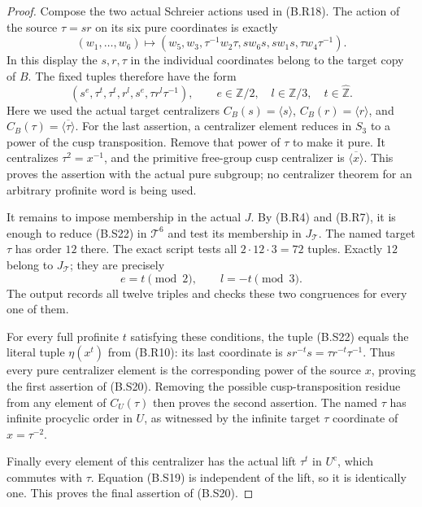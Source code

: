 \begin{proof}
Compose the two actual Schreier actions used in
(B.R18).  The action of the source $\tau=sr$ on its
six pure coordinates is exactly
\[
 (w_1,\ldots,w_6)\longmapsto
 (w_5,w_3,\tau^{-1}w_2\tau,
                    sw_6s,sw_1s,\tau w_4\tau^{-1}).            \tag{B.S21}
\]
In this display the $s,r,\tau$ in the individual
coordinates belong to the target copy of $B$.
The fixed tuples therefore have the form
\[
 (s^e,\tau^t,\tau^t,r^l,s^e,\tau r^l\tau^{-1}),
 \qquad e\in\mathbb Z/2,\quad l\in\mathbb Z/3,
                       \quad t\in\widehat{\mathbb Z}.         \tag{B.S22}
\]
Here we used the actual target centralizers
$C_B(s)=\langle s\rangle$, $C_B(r)=\langle r\rangle$,
and $C_B(\tau)=\overline{\langle\tau\rangle}$.
For the last assertion, a centralizer element reduces
in $S_3$ to a power of the cusp transposition.  Remove
that power of $\tau$ to make it pure.  It centralizes
$\tau^2=x^{-1}$, and the primitive free-group cusp
centralizer is $\overline{\langle x\rangle}$.  This
proves the assertion with the actual pure subgroup;
no centralizer theorem for an arbitrary profinite
word is being used.

It remains to impose membership in the actual $J$.
By (B.R4) and (B.R7), it is enough to reduce (B.S22)
in $\mathcal T^6$ and test its membership in
$J_{\mathcal T}$.  The named target $\tau$ has order
$12$ there.  The exact script
 tests all
$2\cdot12\cdot3=72$ tuples.  Exactly $12$ belong
to $J_{\mathcal T}$; they are precisely
\[
                    e=t\pmod2,\qquad l=-t\pmod3.              \tag{B.S23}
\]
The output records all twelve triples and checks
these two congruences for every one of them.

For every full profinite $t$ satisfying these conditions,
the tuple (B.S22) equals the literal tuple $\eta(x^t)$
from (B.R10): its last coordinate is
$sr^{-t}s=\tau r^{-t}\tau^{-1}$.  Thus every pure
centralizer element is the corresponding power of
the source $x$, proving the first assertion of
(B.S20).  Removing the possible cusp-transposition
residue from any element of $C_U(\tau)$ then proves
the second assertion.  The named $\tau$ has infinite
procyclic order in $U$, as witnessed by the infinite
target $\tau$ coordinate of $x=\tau^{-2}$.

Finally every element of this centralizer has the
actual lift $\tau^t$ in $U^{\mathrm c}$, which
commutes with $\tau$.  Equation (B.S19) is independent
of the lift, so it is identically one.  This proves
the final assertion of (B.S20).
\end{proof}
